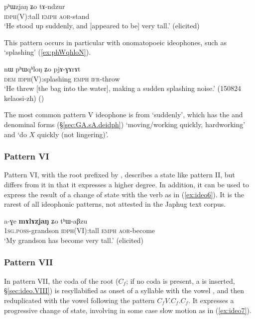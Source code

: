   \begin{exe} 
\ex  \label{ex:ideo5}
\gll  pʰɯzjaŋ ʑo tɤ-ndzur   \\
\textsc{idph}(V):tall \textsc{emph} \textsc{aor}-stand \\
\glt `He stood up suddenly, and [appeared to be] very tall.'  (elicited)
\end{exe}
 
This pattern occurs in particular with onomatopoeic ideophones, such as  `splashing' (\ref{ex:phWqhloN}).

  \begin{exe} 
\ex  \label{ex:phWqhloN}
\gll nɯ pʰɯqʰloŋ ʑo pjɤ-ɣɤrɤt \\
\textsc{dem} \textsc{idph}(V):splashing \textsc{emph} \textsc{ifr}-throw \\
\glt `He threw [the bag into the water], making a sudden splashing noise.' (150824 kelaosi-zh) ()
 \end{exe}
 
 The most common pattern V ideophone is   from  `suddenly', which has  the  and   denominal forms (§\ref{sec:GA.sA.deidph})  `moving/working quickly, hardworking' and  `do $X$ quickly (not lingering)'.

\subsubsection{Pattern VI} \label{sec:ideo.VI}
Pattern VI, with the root prefixed by , describes a state like pattern II, but differs from it in that it expresses a higher degree. In addition, it can be used to express the result of a change of state with the verb  as in (\ref{ex:ideo6}). It is the rarest of all ideophonic patterns, not attested in the Japhug text corpus.

 \begin{exe} 
\ex  \label{ex:ideo6}
\gll a-ɣe \textbf{mɤlɤzjaŋ} ʑo tʰɯ-aβzu   \\
\textsc{1sg}.\textsc{poss}-grandson \textsc{idph}(VI):tall \textsc{emph} \textsc{aor}-become \\
\glt `My grandson has become very tall.'  (elicited)
 \end{exe}

  \subsubsection{Pattern VII} \label{sec:ideo.VII}
In pattern VII, the coda of the root ($C_f$; if no coda is present, a  is inserted, §\ref{sec:ideo.VIII}) is resyllabified as onset of a syllable with the vowel , and then reduplicated with the vowel  following the pattern $C_fV$.$C_f$.$C_f$. It  expresses a progressive change of state, involving in some case slow motion as in (\ref{ex:ideo7}).
 
